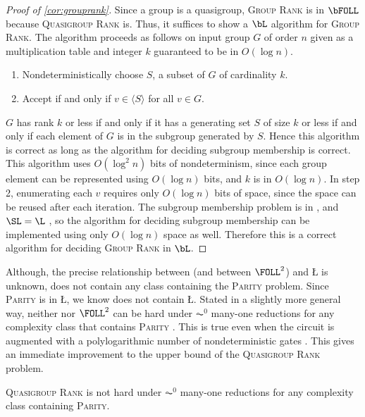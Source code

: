 \documentclass{article}
\begin{document}
\begin{proof}[Proof of \autoref{cor:grouprank}]
  Since a group is a quasigroup, \textsc{Group Rank} is in $\bFOLL$ because \textsc{Quasigroup Rank} is.
  Thus, it suffices to show a $\bL$ algorithm for \textsc{Group Rank}.
  The algorithm proceeds as follows on input group $G$ of order $n$ given as a multiplication table and integer $k$ guaranteed to be in $O(\log n)$.
  \begin{enumerate}
  \item Nondeterministically choose $S$, a subset of $G$ of cardinality $k$.
  \item Accept if and only if $v \in \langle S \rangle$ for all $v \in G$.
  \end{enumerate}
  $G$ has rank $k$ or less if and only if it has a generating set $S$ of size $k$ or less if and only if each element of $G$ is in the subgroup generated by $S$.
  Hence this algorithm is correct as long as the algorithm for deciding subgroup membership is correct.
  This algorithm uses $O(\log^2 n)$ bits of nondeterminism, since each group element can be represented using $O(\log n)$ bits, and $k$ is in $O(\log n)$.
  In step 2, enumerating each $v$ requires only $O(\log n)$ bits of space, since the space can be reused after each iteration.
  The subgroup membership problem is in \SL{} \cite[Section~3]{bm89}, and $\SL = \L$ \cite{reingold08}, so the algorithm for deciding subgroup membership can be implemented using only $O(\log n)$ space as well.
  Therefore this is a correct algorithm for deciding \textsc{Group Rank} in $\bL$.
\end{proof}

Although, the precise relationship between \FOLL{} (and between $\FOLL^2$) and \L{} is unknown, \FOLL{} does not contain any class containing the \textsc{Parity} problem.
Since \textsc{Parity} is in \L, we know \FOLL{} does not contain \L.
Stated in a slightly more general way, neither \FOLL{} nor $\FOLL^2$ can be hard under $\AC^0$ many-one reductions for any complexity class that contains \textsc{Parity} \cite[Proposition~2.1]{bklm01}.
This is true even when the circuit is augmented with a polylogarithmic number of nondeterministic gates \cite[Section~4]{ctw13}.
This gives an immediate improvement to the upper bound of the \textsc{Quasigroup Rank} problem.

\begin{theorem}
  \textsc{Quasigroup Rank} is not hard under $\AC^0$ many-one reductions for any complexity class containing \textsc{Parity}.
\end{theorem}
\end{document}
